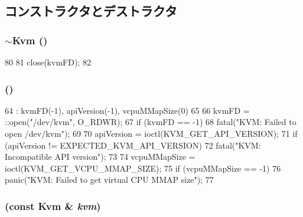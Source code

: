 \subsection{コンストラクタとデストラクタ}
\hypertarget{classKvm_af634ce04aefb47ce4de9d029a9bc0642}{
\subsubsection[{$\sim$Kvm}]{\setlength{\rightskip}{0pt plus 5cm}$\sim${\bf Kvm} ()}}
\label{classKvm_af634ce04aefb47ce4de9d029a9bc0642}



\begin{DoxyCode}
80 {
81     close(kvmFD);
82 }
\end{DoxyCode}
\hypertarget{classKvm_ac52c88ab9138b51acbd7dedc0b4203ea}{
\subsubsection[{Kvm}]{ ()}}
\label{classKvm_ac52c88ab9138b51acbd7dedc0b4203ea}



\begin{DoxyCode}
64     : kvmFD(-1), apiVersion(-1), vcpuMMapSize(0)
65 {
66     kvmFD = ::open("/dev/kvm", O_RDWR);
67     if (kvmFD == -1)
68         fatal("KVM: Failed to open /dev/kvm\n");
69 
70     apiVersion = ioctl(KVM_GET_API_VERSION);
71     if (apiVersion != EXPECTED_KVM_API_VERSION)
72         fatal("KVM: Incompatible API version\n");
73 
74     vcpuMMapSize = ioctl(KVM_GET_VCPU_MMAP_SIZE);
75     if (vcpuMMapSize == -1)
76         panic("KVM: Failed to get virtual CPU MMAP size\n");
77 }
\end{DoxyCode}
\hypertarget{classKvm_a74d2e5969f68c33262ef78b294a41555}{
\subsubsection[{Kvm}]{ (const {\bf Kvm} \& {\em kvm})}}
\label{classKvm_a74d2e5969f68c33262ef78b294a41555}


